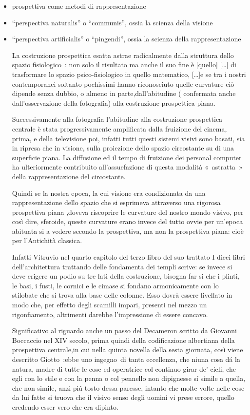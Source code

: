 \begin{itemize}
  \item prospettiva come metodi di rappresentazione\\
  \item “perspectiva naturalis” o “communis”, ossia la scienza della visione
  \item “perspectiva artificialis” o “pingendi”, ossia la scienza della rappresentazione

La costruzione prospettica esatta astrae radicalmente dalla struttura dello
spazio fisiologico : non solo il risultato ma anche il suo fine è [quello] […]
di trasformare lo spazio psico-fisiologico in quello matematico, […]e se tra i
nostri contemporanei soltanto pochissimi hanno riconosciuto quelle curvature ciò
dipende senza dubbio, o almeno in parte,dall’abitudine ( confermata anche
dall’osservazione della fotografia) alla costruzione prospettica piana.

Successivamente alla fotografia l’abitudine alla costruzione prospettica centrale
è stata progressivamente amplificata  dalla fruizione del cinema, prima, e
della televisione poi, infatti tutti questi sistemi visivi sono basati, sia in
ripresa che in visione, sulla proiezione dello spazio circostante su di una
superficie piana. La diffusione ed il tempo di fruizione dei personal computer
ha ulteriormente contribuito all’assuefazione di questa modalità « astratta »
della rappresentazione del circostante.

Quindi se la nostra epoca, la cui visione era condizionata da una
rappresentazione dello spazio che si esprimeva attraverso una rigorosa
prospettiva piana ,doveva riscoprire le curvature del nostro mondo visivo, per
così dire, sferoide, queste curvature erano invece del tutto ovvie per un’epoca
abituata si a vedere  secondo la prospettiva, ma non la prospettiva piana: cioè
per l’Antichità classica.

Infatti Vitruvio nel quarto capitolo del terzo libro  del suo trattato  I dieci
libri dell’architettura trattando delle fondamenta dei templi scrive: se invece
si deve erigere un podio su tre lati della costruzione, bisogna far si che i
plinti, le basi, i fusti, le cornici e le cimase si fondano armonicamente con
lo stilobate che si trova alla base delle colonne. Esso dovrà essere livellato
in modo che, per effetto degli scamilli impari, presenti nel mezzo un
rigonfiamento, altrimenti darebbe l’impressione di essere concavo.

Significativo al riguardo anche un passo del Decameron  scritto da Giovanni
Boccaccio nel XIV  secolo, prima quindi della codificazione albertiana della
prospettiva centrale,in cui nella quinta novella della sesta giornata, così
viene descritto Giotto :ebbe uno ingegno di tanta eccellenza, che niuna cosa dá
la natura, madre di tutte le cose ed operatrice col continuo girar de’ cieli,
che egli con lo stile e con la penna o col pennello non dipignesse sí simile a
quella, che non simile, anzi piú tosto dessa paresse, intanto che molte volte
nelle cose da lui fatte si truova che il visivo senso degli uomini vi prese
errore, quello credendo esser vero che era dipinto.


\end{itemize}
